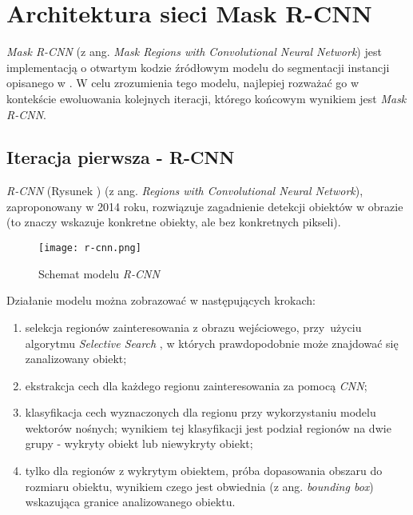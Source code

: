 \section{Architektura sieci Mask R-CNN}
\label{sec:architekrura_mask_rcnn}

\textit{Mask R-CNN} \cite{matterport-mask-rcnn} (z ang. \textit{Mask Regions with Convolutional Neural Network}) jest implementacją o otwartym kodzie źródłowym modelu do segmentacji instancji opisanego w \cite{general-mask-rcnn}.
W celu zrozumienia tego modelu, najlepiej rozważać go w kontekście ewoluowania kolejnych iteracji, którego końcowym wynikiem jest \textit{Mask R-CNN}.

\subsection{Iteracja pierwsza - R-CNN}

\textit{R-CNN} \cite{rcnn} (Rysunek ) (z ang. \textit{Regions with Convolutional Neural Network}), zaproponowany w 2014 roku, rozwiązuje zagadnienie detekcji obiektów w obrazie (to znaczy wskazuje konkretne obiekty, ale bez konkretnych pikseli).

\begin{figure}[h]
  \centering
  \texttt{[image: r-cnn.png]}
  \caption{Schemat modelu \textit{R-CNN}}
  \label{fig:r_cnn}
\end{figure}

Działanie modelu można zobrazować w następujących krokach:
\label{sec:regiony}
\begin{enumerate}
  \item selekcja regionów zainteresowania z obrazu wejściowego, przy~użyciu algorytmu \textit{Selective Search} \cite{selective-search}, w których prawdopodobnie może znajdować się zanalizowany obiekt;
  \item ekstrakcja cech dla każdego regionu zainteresowania za pomocą \textit{CNN};
  \item klasyfikacja cech wyznaczonych dla regionu przy wykorzystaniu modelu wektorów nośnych; wynikiem tej klasyfikacji jest podział regionów na dwie grupy - wykryty obiekt lub niewykryty obiekt;
  \item tylko dla regionów z wykrytym obiektem, próba dopasowania obszaru do rozmiaru obiektu, wynikiem czego jest obwiednia (z ang. \textit{bounding box}) wskazująca granice analizowanego obiektu.
\end{enumerate}

